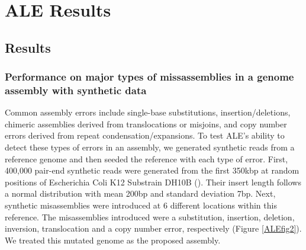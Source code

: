 \documentclass[phd,tocprelim]{cornell}
\begin{document}


\chapter{ALE Results} %
\label{cha:ALE Results}

\section{Results}

\subsection{Performance on major types of missassemblies in a genome assembly with synthetic data}
Common assembly errors include single-base substitutions, insertion/deletions, chimeric assemblies derived from translocations or misjoins, and copy number errors derived from repeat condensation/expansions. To test ALE’s ability to detect these types of errors in an assembly, we generated synthetic reads from a reference genome and then seeded the reference with each type of error. First, 400,000 pair-end synthetic reads were generated from the first 350kbp at random positions of Escherichia Coli K12 Substrain DH10B (\cite{Durfee2008}). Their insert length follows a normal distribution with mean 200bp and standard deviation 7bp. Next, synthetic misassemblies were introduced at 6 different locations within this reference.  The misassemblies introduced were a substitution, insertion, deletion, inversion, translocation and a copy number error, respectively (Figure \ref{ALEfig2}). We treated this mutated genome as the proposed assembly.
\end{document}
